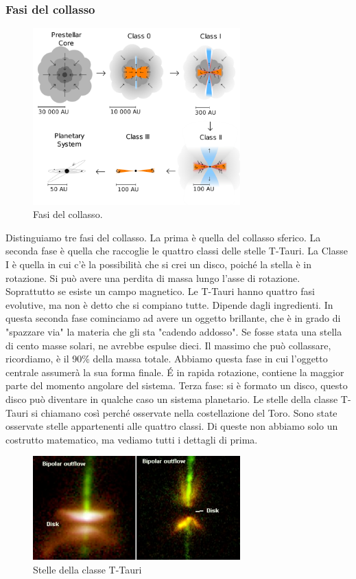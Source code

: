 \documentclass[a4paper,11pt]{article}
\begin{document}
\subsubsection{Fasi del collasso}
\begin{figure}[h!!]
        \centering
        \includegraphics[width=8cm]{lezione 28 novembre/ttauri.png}
        \caption{Fasi del collasso.}
        \label{lezione 28 novembre/ttauri.png}
    \end{figure}
Distinguiamo tre fasi del collasso. La prima è quella del collasso sferico. La seconda fase è quella che raccoglie le quattro classi delle stelle T-Tauri. La Classe I è quella in cui c'è la possibilità che si crei un disco, poiché la stella è in rotazione. Si può avere una perdita di massa lungo l'asse di rotazione. Soprattutto se esiste un campo magnetico. Le T-Tauri hanno quattro fasi evolutive, ma non è detto che si compiano tutte. Dipende dagli ingredienti. In questa seconda fase cominciamo ad avere un oggetto brillante, che è in grado di "spazzare via" la materia che gli sta "cadendo addosso". Se fosse stata una stella di cento masse solari, ne avrebbe espulse dieci. Il massimo che può collassare, ricordiamo, è il 90\% della massa totale. Abbiamo questa fase in cui l'oggetto centrale assumerà la sua forma finale. \'E in rapida rotazione, contiene la maggior parte del momento angolare del sistema. Terza fase: si è formato un disco, questo disco può diventare in qualche caso un sistema planetario. Le stelle della classe T-Tauri si chiamano così perché osservate nella costellazione del Toro. Sono state osservate stelle appartenenti alle quattro classi. Di queste non abbiamo solo un costrutto matematico, ma vediamo tutti i dettagli di prima.
\begin{figure}[h!!]
        \centering
        \includegraphics[width=8cm]{lezione 28 novembre/dischigettidimateria.png}
        \caption{Stelle della classe T-Tauri}
        \label{lezione 28 novembre/dischigettidimateria.png}
    \end{figure}
\end{document}
